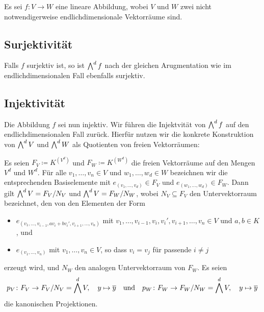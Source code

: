 Es sei $f \colon V \to W$ eine lineare Abbildung, wobei $V$ und $W$ zwei nicht notwendigerweise endlichdimensionale Vektorräume sind.



\subsection{Surjektivität}

Falls $f$ surjektiv ist, so ist $\bigwedge^{d} f$ nach der gleichen Arugmentation wie im endlichdimensionalen Fall ebenfalls surjektiv.



\subsection{Injektivität}

Die Abbildung $f$ sei nun injektiv.
Wir führen die Injektvität von $\bigwedge^{d} f$ auf den endlichdimensionalen Fall zurück.
Hierfür nutzen wir die konkrete Konstruktion von $\bigwedge^{d} V$ und $\bigwedge^{d} W$ als Quotienten von freien Vektorräumen:

Es seien $F_V \coloneqq K^{(V^d)}$ und $F_W \coloneqq K^{(W^d)}$ die freien Vektorräume auf den Mengen $V^d$ und $W^d$.
Für alle $v_1, \dotsc, v_n \in V$ und $w_1, \dotsc, w_d \in W$ bezeichnen wir die entsprechenden Basiselemente mit $e_{(v_1, \dotsc, v_d)} \in F_V$ und $e_{(w_1, \dotsc, w_d)} \in F_W$.
Dann gilt $\bigwedge^{d} V = F_V/N_V$ und $\bigwedge^{d} V = F_W/N_W$, wobei $N_V \subseteq F_V$ den Untervektorraum bezeichnet, den von den Elementen der Form
\begin{itemize}
  \item
    $e_{(v_1, \dotsc, v_{i-1}, a v_i + b v_i', v_{i+1}, \dotsc, v_n)}$ mit $v_1, \dotsc, v_{i-1}, v_i, v_i', v_{i+1}, \dotsc, v_n \in V$ und $a, b \in K$, und
  \item
    $e_{(v_1, \dotsc, v_n)}$ mit $v_1, \dotsc, v_n \in V$, so dass $v_i = v_j$ für passende $i \neq j$
\end{itemize}
erzeugt wird, und $N_W$ den analogen Untervektorraum von $F_W$.
Es seien
\[
          p_V
  \colon  F_V
  \to     F_V/N_V
  =       \bigwedge^{d} V,
  \quad   y
  \mapsto \overline{y}
  \quad\text{und}\quad
  p_W
  \colon  F_W
  \to     F_W/N_W
  =       \bigwedge^{d} V,
  \quad   y
  \mapsto \overline{y}
\]
die kanonischen Projektionen.

